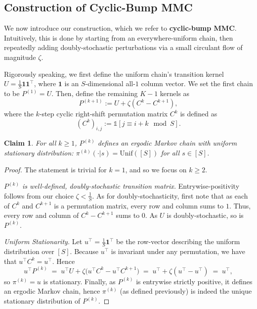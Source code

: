 \documentclass[twoside]{article}
\theoremstyle{plain}
\newtheorem{claim}{Claim}[section]
\newcommand{\indicator}{\mathds{1}}
\begin{document}
\subsection{Construction of Cyclic-Bump MMC}
\label{app:cylic-bump}
We now introduce our construction, which we refer to \textbf{cyclic-bump MMC}.
Intuitively, this is done by starting from an everywhere-uniform chain, then repeatedly adding doubly-stochastic perturbations via a small circulant flow of magnitude $\zeta$.

Rigorously speaking, we first define the uniform chain's transition kernel $U = \frac{1}{S} \mathbf{1} \mathbf{1}^\top$, where $\mathbf{1}$ is an $S$-dimensional all-$1$ column vector.
We set the first chain to be $P^{(1)} = U$.
Then, define the remaining $K - 1$ kernels as
\begin{equation}
    P^{(k+1)} := U + \zeta \left( C^k - C^{k + 1} \right),
\end{equation}
where the $k$-step cyclic right-shift permutation matrix $C^k$ is defined as
\begin{equation}
    \left( C^k \right)_{i,j} := \indicator[j \equiv i + k \mod S].
\end{equation}


\begin{claim}
    For all $k \geq 1$, $P^{(k)}$ defines an ergodic Markov chain with uniform stationary distribution: $\pi^{(k)}(\cdot | s) = \mathrm{Unif}([S])$ for all $s \in [S]$.
\end{claim}
\begin{proof}
    The statement is trivial for $k = 1$, and so we focus on $k \geq 2.$

    \emph{$P^{(k)}$ is well-defined, doubly-stochastic transition matrix.}
    Entrywise-positivity follows from our choice $\zeta < \frac{1}{S}.$
    As for doubly-stochasticity, first note that as each of $C^k$ and $C^{k+1}$ is a permutation matrix, every row and column sums to $1$.
    Thus, every row and column of $C^k - C^{k+1}$ sums to $0$.
    As $U$ is doubly-stochastic, so is $P^{(k)}$.
    
    \emph{Uniform Stationarity.}
    Let $u^\top=\tfrac1S\mathbf 1^\top$ be the row-vector describing the uniform distribution over $[S]$.
    Because $u^\top$ is invariant under any permutation, we have that $u^\top C^k = u^\top$.
    Hence
    \begin{equation*}
    u^\top P^{(k)} \;=\; u^\top U + \zeta \big(u^\top C^k - u^\top C^{k+1}\big)
    \;=\; u^\top + \zeta (u^\top-u^\top) \;=\; u^\top,
    \end{equation*}
    so $\pi^{(k)} = u$ is stationary.
    Finally, as $P^{(k)}$ is entrywise strictly positive, it defines an ergodic Markov chain, hence $\pi^{(k)}$ (as defined previously) is indeed the unique stationary distribution of $P^{(k)}$.
\end{proof}
\end{document}
